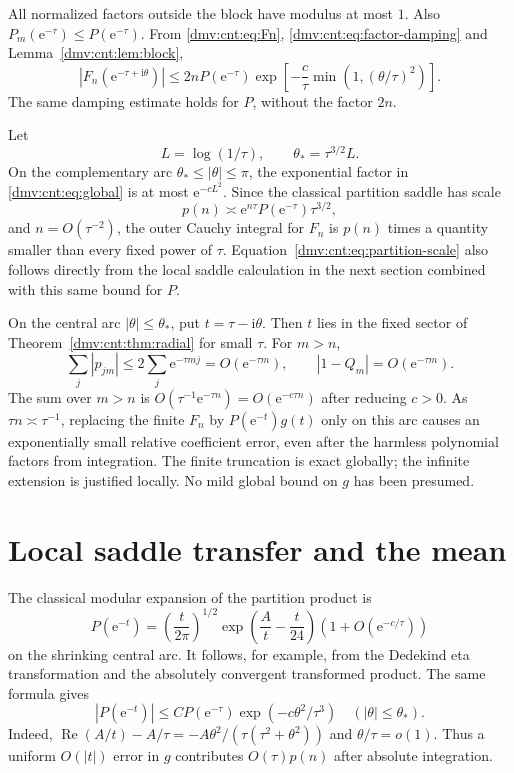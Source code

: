 \documentclass[11pt,letterpaper]{article}
\numberwithin{equation}{section}
\theoremstyle{definition}\newtheorem{definition}[theorem]{Definition}
\theoremstyle{remark}\newtheorem{remark}[theorem]{Remark}
\newcommand{\ii}{\mathrm i}
\newcommand{\ee}{\mathrm e}
\DeclareMathOperator{\Rea}{Re}
\begin{document}
All normalized factors outside the block have modulus at most $1$. Also $P_m(\ee^{-\tau})\le P(\ee^{-\tau})$. From \eqref{dmv:cnt:eq:Fn}, \eqref{dmv:cnt:eq:factor-damping} and Lemma~\ref{dmv:cnt:lem:block},
\begin{equation}\label{dmv:cnt:eq:global}
|F_n(\ee^{-\tau+\ii\theta})|
\le2nP(\ee^{-\tau})
\exp\left[-\frac c\tau\min\left(1,(\theta/\tau)^2\right)\right].
\end{equation}
The same damping estimate holds for $P$, without the factor $2n$.

Let
\begin{equation}\label{dmv:cnt:eq:central}
L=\log(1/\tau),\qquad \theta_*=\tau^{3/2}L.
\end{equation}
On the complementary arc $\theta_*\le|\theta|\le\pi$, the exponential factor in \eqref{dmv:cnt:eq:global} is at most $\ee^{-cL^2}$. Since the classical partition saddle has scale
\begin{equation}\label{dmv:cnt:eq:partition-scale}
p(n)\asymp \ee^{n\tau}P(\ee^{-\tau})\tau^{3/2},
\end{equation}
and $n=O(\tau^{-2})$, the outer Cauchy integral for $F_n$ is $p(n)$ times a quantity smaller than every fixed power of $\tau$. Equation~\eqref{dmv:cnt:eq:partition-scale} also follows directly from the local saddle calculation in the next section combined with this same bound for $P$.

On the central arc $|\theta|\le\theta_*$, put $t=\tau-\ii\theta$. Then $t$ lies in the fixed sector of Theorem~\ref{dmv:cnt:thm:radial} for small $\tau$. For $m>n$,
\[
\sum_j|p_{jm}|\le2\sum_j\ee^{-\tau mj}=O(\ee^{-\tau m}),
\qquad |1-Q_m|=O(\ee^{-\tau m}).
\]
The sum over $m>n$ is $O(\tau^{-1}\ee^{-\tau n})=O(\ee^{-c\tau n})$ after reducing $c>0$. As $\tau n\asymp\tau^{-1}$, replacing the finite $F_n$ by $P(\ee^{-t})g(t)$ only on this arc causes an exponentially small relative coefficient error, even after the harmless polynomial factors from integration. The finite truncation is exact globally; the infinite extension is justified locally. No mild global bound on $g$ has been presumed.

\section{Local saddle transfer and the mean}\label{dmv:cnt:sec:transfer}
The classical modular expansion of the partition product is
\begin{equation}\label{dmv:cnt:eq:modular}
P(\ee^{-t})=\left(\frac{t}{2\pi}\right)^{1/2}
\exp\left(\frac At-\frac t{24}\right)
\left(1+O(\ee^{-c/\tau})\right)
\end{equation}
on the shrinking central arc. It follows, for example, from the Dedekind eta transformation and the absolutely convergent transformed product. The same formula gives
\begin{equation}\label{dmv:cnt:eq:central-gauss}
|P(\ee^{-t})|\le CP(\ee^{-\tau})\exp(-c\theta^2/\tau^3)
\quad (|\theta|\le\theta_*).
\end{equation}
Indeed, $\Rea(A/t)-A/\tau=-A\theta^2/(\tau(\tau^2+\theta^2))$ and $\theta/\tau=o(1)$. Thus a uniform $O(|t|)$ error in $g$ contributes $O(\tau)p(n)$ after absolute integration.
\end{document}
